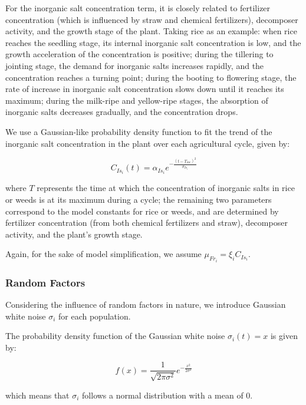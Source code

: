 \documentclass{HZNUMCM}
\begin{document}
        For the inorganic salt concentration term, 
        it is closely related to fertilizer concentration (which is influenced by straw and chemical fertilizers), 
        decomposer activity, and the growth stage of the plant. Taking rice as an example: when rice reaches the seedling stage, 
        its internal inorganic salt concentration is low, and the growth acceleration of the concentration is positive; 
        during the tillering to jointing stage, the demand for inorganic salts increases rapidly, and the concentration reaches a turning point; 
        during the booting to flowering stage, the rate of increase in inorganic salt concentration slows down until it reaches its maximum; 
        during the milk-ripe and yellow-ripe stages, the absorption of inorganic salts decreases gradually, and the concentration drops.\cite{garcia2003logistic}
        
        We use a Gaussian-like probability density function to fit the trend of the inorganic salt concentration in the plant over each agricultural cycle, given by:
        
        \[
        C_{Is_i}(t) = \alpha_{Is_i} e^{-\frac{(t - T_{mc})^2}{\sigma_{Is_i}}}
        \]

        where \( T \) represents the time at which the concentration of inorganic salts in rice or weeds is at its maximum during a cycle; the remaining two parameters correspond to the model constants for rice or weeds, 
        and are determined by fertilizer concentration (from both chemical fertilizers and straw), decomposer activity, and the plant's growth stage.

        Again, for the sake of model simplification, we assume \( \mu_{Fr_i} = \xi_{i} C_{Is_i} \).
      \subsubsection{Random Factors}
        Considering the influence of random factors in nature, we introduce Gaussian white noise \(\sigma_i\) for each population.
        
        The probability density function of the Gaussian white noise \(\sigma_i(t) = x\) is given by:

        \begin{equation}
        f(x) = \frac{1}{\sqrt{2\pi\sigma^2}} e^{-\frac{x^2}{2\sigma^2}}
        \end{equation}

        which means that \(\sigma_i\) follows a normal distribution with a mean of 0.
        
\end{document}
